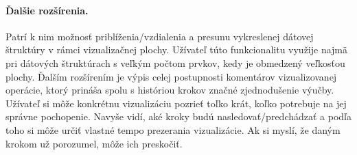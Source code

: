 \paragraph{Ďalšie rozšírenia.}
Patrí k nim
možnosť priblíženia/vzdialenia a presunu vykreslenej dátovej štruktúry v rámci
vizualizačnej plochy. Užívateľ túto funkcionalitu využije najmä pri dátových
štruktúrach s veľkým počtom prvkov, kedy je obmedzený veľkosťou plochy. Ďalším
rozšírením je výpis celej postupnosti komentárov vizualizovanej operácie,
ktorý prináša spolu s históriou krokov značné zjednodušenie
výučby. Užívateľ si môže konkrétnu vizualizáciu pozrieť toľko krát, koľko
potrebuje na jej správne pochopenie. Navyše vidí, aké kroky budú
nasledovať/predchádzať a podľa toho si môže určiť vlastné tempo prezerania
vizualizácie. Ak si myslí, že daným krokom už porozumel, môže ich preskočiť.

